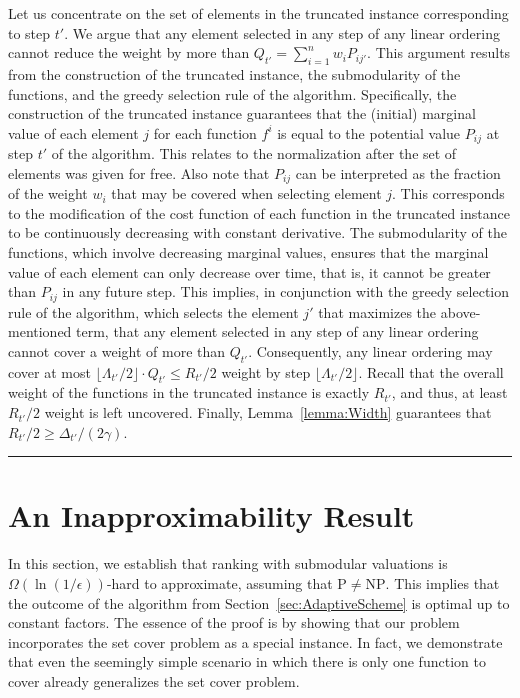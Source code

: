 \documentclass[11pt]{article}
\theoremstyle{plain}
\theoremstyle{definition}
\newcommand{\qedsymb}{\hfill{\rule{2mm}{2mm}}}
\renewenvironment{proof}{\begin{trivlist} \item[\hspace{\labelsep}{\bf \noindent Proof.\/}] }{\qedsymb\end{trivlist}}\newenvironment{proofof}[1]{\begin{trivlist} \item[\hspace{\labelsep}{\bf \noindent Proof of #1.\/}] }{\qedsymb\end{trivlist}}\newenvironment{MyEqn}[1]{\setlength\arraycolsep{2pt}\begin{eqnarray*} #1}{\end{eqnarray*}}
\newcommand{\floor}[1]{\lfloor #1 \rfloor}
\begin{document}
\begin{proof}
Let us concentrate on the set of elements in the truncated
instance corresponding to step $t'$. We argue that any element
selected in any step of any linear ordering cannot reduce the
weight by more than $Q_{t'} = \sum_{i = 1}^n w_i P_{ij'}$. This
argument results from the construction of the truncated instance,
the submodularity of the functions, and the greedy selection rule
of the algorithm. Specifically, the construction of the truncated
instance guarantees that the (initial) marginal value of each
element $j$ for each function $f^i$ is equal to the potential
value $P_{ij}$ at step $t'$ of the algorithm. This relates to the
normalization after the set of elements was given for free. Also
note that $P_{ij}$ can be interpreted as the fraction of the
weight $w_i$ that may be covered when selecting element $j$. This
corresponds to the modification of the cost function of each
function in the truncated instance to be continuously decreasing
with constant derivative. The submodularity of the functions,
which involve decreasing marginal values, ensures that the
marginal value of each element can only decrease over time, that
is, it cannot be greater than $P_{ij}$ in any future step. This
implies, in conjunction with the greedy selection rule of the
algorithm, which selects the element $j'$ that maximizes the
above-mentioned term, that any element selected in any step of any
linear ordering cannot cover a weight of more than $Q_{t'}$.
Consequently, any linear ordering may cover at most
$\floor{\Lambda_{t'} / 2} \cdot Q_{t'} \leq R_{t'} / 2$ weight by
step $\floor{\Lambda_{t'} / 2}$. Recall that the overall weight of
the functions in the truncated instance is exactly $R_{t'}$, and
thus, at least $R_{t'} / 2$ weight is left uncovered. Finally,
Lemma~\ref{lemma:Width} guarantees that $R_{t'} / 2 \geq
\Delta_{t'} / (2\gamma)$.~
\end{proof}


\section{An Inapproximability Result} \label{sec:Hardness}

In this section, we establish that ranking with submodular
valuations is $\Omega(\ln(1 / \epsilon))$-hard to approximate,
assuming that $\mathrm{P} \neq \mathrm{NP}$. This implies that the
outcome of the algorithm from Section~\ref{sec:AdaptiveScheme} is
optimal up to constant factors. The essence of the proof is by
showing that our problem incorporates the set cover problem as a
special instance. In fact, we demonstrate that even the seemingly
simple scenario in which there is only one function to cover
already generalizes the set cover problem.
\end{document}
